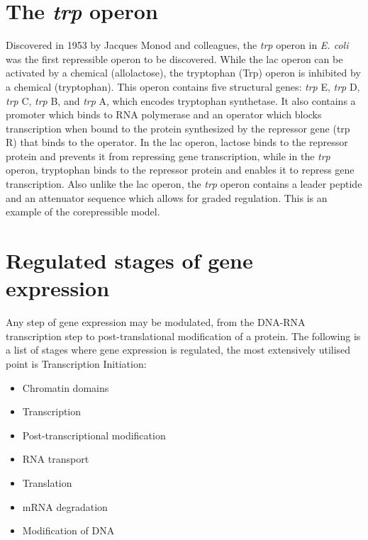 \hypertarget{the-trp-operon}{%
\section{\texorpdfstring{The \emph{trp} operon}{The trp operon}}\label{the-trp-operon}}

Discovered in 1953 by Jacques Monod and colleagues, the \emph{trp} operon in \emph{E. coli} was the first repressible operon to be discovered. While the lac operon can be activated by a chemical (allolactose), the tryptophan (Trp) operon is inhibited by a chemical (tryptophan). This operon contains five structural genes: \emph{trp} E, \emph{trp} D, \emph{trp} C, \emph{trp} B, and \emph{trp} A, which encodes tryptophan synthetase. It also contains a promoter which binds to RNA polymerase and an operator which blocks transcription when bound to the protein synthesized by the repressor gene (trp R) that binds to the operator. In the lac operon, lactose binds to the repressor protein and prevents it from repressing gene transcription, while in the \emph{trp} operon, tryptophan binds to the repressor protein and enables it to repress gene transcription. Also unlike the lac operon, the \emph{trp} operon contains a leader peptide and an attenuator sequence which allows for graded regulation. This is an example of the corepressible model.

\hypertarget{regulated-stages-of-gene-expression}{%
\section{Regulated stages of gene expression}\label{regulated-stages-of-gene-expression}}

Any step of gene expression may be modulated, from the DNA-RNA transcription step to post-translational modification of a protein. The following is a list of stages where gene expression is regulated, the most extensively utilised point is Transcription Initiation:

\begin{itemize}
\tightlist
\item
  Chromatin domains
\item
  Transcription
\item
  Post-transcriptional modification
\item
  RNA transport
\item
  Translation
\item
  mRNA degradation
\item
  Modification of DNA
\end{itemize}

